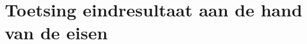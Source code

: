 \chapter{Toetsing eindresultaat aan de hand van de eisen}
\label{Toetsing_eindresultaat_aan_de_hand_van_de_eisen}
